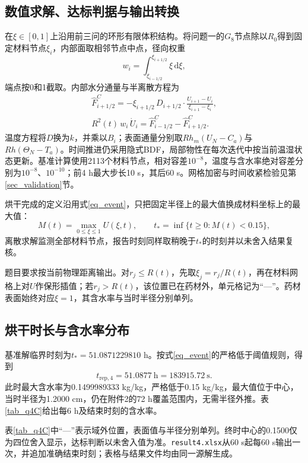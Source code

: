 \subsection{数值求解、达标判据与输出转换}
在$\xi\in[0,1]$上沿用前三问的环形有限体积结构。将问题一的$G_8$节点除以$R_0$得到固定材料节点$\xi_i$，内部面取相邻节点中点，径向权重
\[
w_i=\int_{\xi_{i-1/2}}^{\xi_{i+1/2}}\xi\,\mathrm d\xi,
\]
端点按0和1截取。内部水分通量与半离散方程为
\begin{equation}\label{eq_shrink_fvm}
\begin{gathered}
\widehat F^C_{i+1/2}
=-\xi_{i+1/2}\,D_{i+1/2}
\cdot\frac{U_{i+1}-U_i}{\xi_{i+1}-\xi_i},\\[6pt]
R^{2}(t)\,w_i\,\dot U_i
=\widehat F^C_{i-1/2}-\widehat F^C_{i+1/2}.
\end{gathered}
\end{equation}
温度方程将$D$换为$k$，并乘以$B_i$；表面通量分别取$R h_m(U_N-C_a)$与$R h(\Theta_N-T_a)$。时间推进仍采用隐式BDF，局部物性在每次迭代中按当前温湿状态更新。基准计算使用2113个材料节点，相对容差$10^{-8}$，温度与含水率绝对容差分别为$10^{-8}$、$10^{-10}$；前4 h最大步长10 s，其后60 s。网格加密与时间收紧检验见第\ref{sec_validation}节。

烘干完成的定义沿用式\eqref{eq_event}，只把固定半径上的最大值换成材料坐标上的最大值：
\[
M(t)=\max_{0\le\xi\le1}U(\xi,t),\qquad
t_*=\inf\{t\ge0:M(t)<0.15\},
\]
离散求解监测全部材料节点，报告时刻同样取稍晚于$t_*$的时刻并以未舍入结果复核。

题目要求按当前物理距离输出。对$r_j\le R(t)$，先取$\xi_j=r_j/R(t)$，再在材料网格上对$U$作保形插值；若$r_j>R(t)$，该位置已在药材外，单元格记为“---”。药材表面始终对应$\xi=1$，其含水率与当时半径分别单列。

\subsection{烘干时长与含水率分布}
基准解临界时刻为$t_*=51.0871229810$ h。按式\eqref{eq_event}的严格低于阈值规则，得到
\begin{equation}\label{eq_q4_answer}
t_{\mathrm{rep},4}=51.0877\ \mathrm h=183915.72\ \mathrm s.
\end{equation}
此时最大含水率为0.1499989333 kg/kg，严格低于0.15 kg/kg，最大值位于中心，当时半径为1.2000 cm，仍在附件2的72 h覆盖范围内，无需半径外推。表\ref{tab_q4C}给出每6 h及结束时刻的含水率。



表\ref{tab_q4C}中“---”表示域外位置，表面值与半径分别单列。终时中心的0.1500仅为四位舍入显示，达标判断以未舍入值为准。\texttt{result4.xlsx}从60 s起每60 s输出一次，并追加准确结束时刻；表格与结果文件均由同一源解生成。

